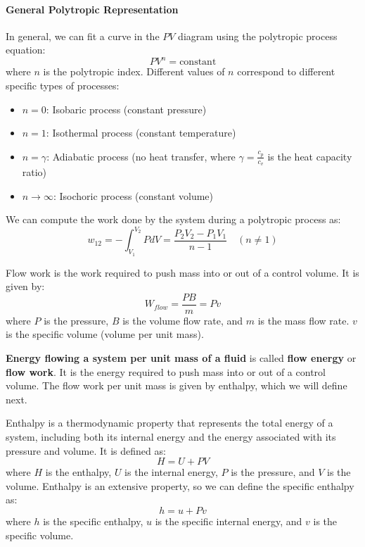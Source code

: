 \documentclass[11pt]{report}
\begin{document}
\paragraph{General Polytropic Representation} In general, we can fit a curve in the $PV$ diagram using the polytropic process equation:
\begin{equation}
    P V^n = \text{constant}
\end{equation}
where $n$ is the polytropic index. Different values of $n$ correspond to different specific types of processes:
\begin{itemize}
    \item $n = 0$: Isobaric process (constant pressure)
    \item $n = 1$: Isothermal process (constant temperature)
    \item $n = \gamma$: Adiabatic process (no heat transfer, where $\gamma = \frac{c_p}{c_v}$ is the heat capacity ratio)
    \item $n \to \infty$: Isochoric process (constant volume)
\end{itemize}
We can compute the work done by the system during a polytropic process as:
\begin{equation}
    w_{12} = -\int_{V_1}^{V_2} P dV = \frac{P_2 V_2 - P_1 V_1}{n - 1} \quad (n \neq 1)
\end{equation}

\begin{definition}
    Flow work is the work required to push mass into or out of a control volume. It is given by:
    \begin{equation}
        W_{flow} = \frac{PB}{m} = Pv
    \end{equation}
    where $P$ is the pressure, $B$ is the volume flow rate, and $m$ is the mass flow rate. $v$ is the specific volume (volume per unit mass).
    
    \textbf{Energy flowing a system per unit mass of a fluid} is called \textbf{flow energy} or \textbf{flow work}. It is the energy required to push mass into or out of a control volume. The flow work per unit mass is given by enthalpy, which we will define next.
\end{definition}


\begin{definition}[Enthalpy]
    Enthalpy is a thermodynamic property that represents the total energy of a system, including both its internal energy and the energy associated with its pressure and volume. It is defined as:
    \begin{equation}
        H = U + PV
    \end{equation}
    where $H$ is the enthalpy, $U$ is the internal energy, $P$ is the pressure, and $V$ is the volume. Enthalpy is an extensive property, so we can define the specific enthalpy as:
    \begin{equation}
        h = u + Pv
    \end{equation}
    where $h$ is the specific enthalpy, $u$ is the specific internal energy, and $v$ is the specific volume.
    
\end{definition}
\end{document}
